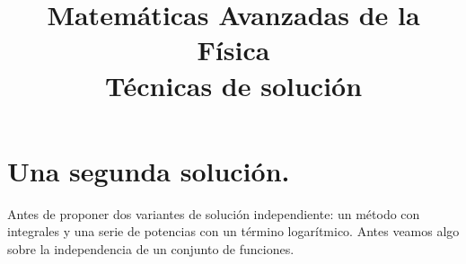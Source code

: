 
\title{Matemáticas Avanzadas de la Física \\ {\large Técnicas de solución}}
\date{ }

\renewcommand\labelenumii{\theenumi.{\arabic{enumii}}}
\maketitle
\fontsize{14}{14}\selectfont
\section{Una segunda solución.}
Antes de proponer dos variantes de solución independiente: un método con integrales y una serie de potencias con un término logarítmico. Antes veamos algo sobre la independencia de un conjunto de funciones.
